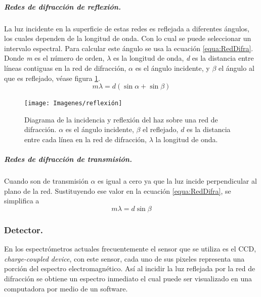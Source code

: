 \subparagraph{Redes de difracción de reflexión.}
La luz incidente en la superficie de estas redes es reflejada a diferentes ángulos, los cuales dependen de la longitud de onda. Con lo cual se puede seleccionar un intervalo espectral. Para calcular este ángulo se usa la ecuación \ref{equa:RedDifra}. Donde \textit{m} es el número de orden, $\lambda$ es la longitud de onda, \textit{d} es la distancia entre líneas contiguas en la red de difracción, $\alpha$ es el ángulo incidente, y $\beta$ el ángulo al que es reflejado, véase figura \ref{fig:reflexion}.
\begin{equation}
	m\lambda = d(\sin\alpha + \sin\beta)
	\label{equa:RedDifra}
\end{equation}
\begin{figure}[h]
	\centering
	\texttt{[image: Imagenes/reflexión]}
	\caption{Diagrama de la incidencia y reflexión del haz sobre una red de difracción. $\alpha$ es el ángulo incidente, $\beta$ el reflejado, $d$  es la distancia entre cada línea en la red de difracción, $\lambda$ la longitud de onda. \cite{Excel2000}}
	\label{fig:reflexion}
\end{figure}


\subparagraph{Redes de difracción de transmisión.}
Cuando son de transmisión $\alpha$ es igual a cero ya que la luz incide perpendicular al plano de la red. Sustituyendo ese valor en la ecuación \ref{equa:RedDifra}, se simplifica a
\begin{equation}
m\lambda = d\sin\beta
\label{equa:difra}
\end{equation}
\subsubsection{Detector.}
En los espectrómetros actuales frecuentemente el sensor que se utiliza es el CCD, \textit{charge-coupled device}, con este sensor, cada uno de sus pixeles representa una porción del espectro electromagnético. Así al incidir la luz reflejada por la red de difracción se obtiene un espectro inmediato el cual puede ser visualizado en una computadora por medio de un software.

